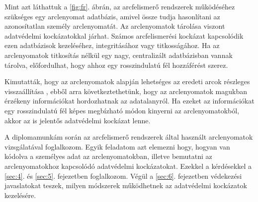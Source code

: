
Mint azt láthattuk a \ref{fig:fr}. ábrán, az arcfelismerő rendszerek működéséhez szükséges egy arclenyomat adatbázis, amivel össze tudja hasonlítani az azonosítatlan személy arclenyomatát. Az arclenyomatok tárolása viszont adatvédelmi kockázatokkal járhat. Számos arcfelismerési kockázat kapcsolódik ezen adatbázisok kezeléséhez, integritásához vagy titkosságához. Ha az arclenyomatok titkosítás nélkül egy nagy, centralizált adatbázisban vannak tárolva, előfordulhat, hogy ahhoz egy rosszindulatú fél hozzáférést szerez.

Kimutatták, hogy az arclenyomatok alapján lehetséges az eredeti arcok részleges visszaállítása \cite{mai2018reconstruction}, ebből arra következtethetünk, hogy az arclenyomatok magukban érzékeny információkat hordozhatnak az adatalanyról. Ha ezeket az információkat egy rosszindulatú fél képes megbízható módon kinyerni az arclenyomatokból, akkor az is jelentős adatvédelmi kockázat lenne.

A diplomamunkám során az arcfelismerő rendszerek által használt arclenyomatok vizsgálatával foglalkozom. Egyik feladatom azt elemezni hogy, hogyan van kódolva a személyes adat az arclenyomatokban, illetve bemutatni az arclenyomatokhoz kapcsolódó adatvédelmi kockázatokat. Ezekkel a kérdésekkel a \ref{sec:4}. és \ref{sec:5}. fejezetben foglalkozom. Végül a \ref{sec:6}. fejezetben védekezési javaslatokat teszek, milyen módszerek működhetnek az adatvédelmi kockázatok kezelésére.





